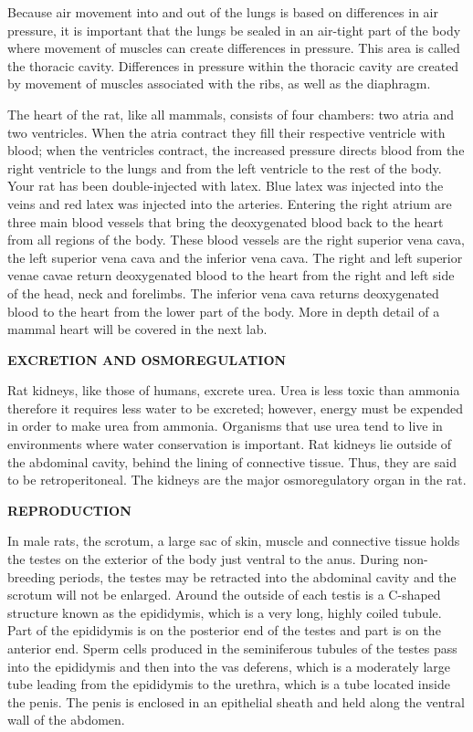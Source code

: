 \documentclass[
]{book}
\begin{document}
Because air movement into and out of the lungs is based on differences in air pressure, it is important that the lungs be sealed in an air-tight part of the body where movement of muscles
can create differences in pressure. This area is called the thoracic cavity. Differences in pressure
within the thoracic cavity are created by movement of muscles associated with the ribs, as well as the diaphragm.

The heart of the rat, like all mammals, consists of four chambers: two atria and two ventricles. When the atria contract they fill their respective ventricle with blood; when the ventricles contract, the increased pressure directs blood from the right ventricle to the lungs and from the left ventricle to the rest of the body. Your rat has been double-injected with latex. Blue latex was injected into the veins and red latex was injected into the arteries. Entering the right atrium are three main blood vessels that bring the deoxygenated blood back to the heart from all regions of the body. These blood vessels are the right superior vena cava, the left superior vena cava and the inferior vena cava. The right and left superior venae cavae return deoxygenated blood to the heart from the right and left side of the head, neck and forelimbs. The inferior vena cava returns deoxygenated blood to the heart from the lower part of the body. More in depth detail of a mammal heart will be covered in the next lab.

\textbf{EXCRETION AND OSMOREGULATION}

Rat kidneys, like those of humans, excrete urea. Urea is less toxic than ammonia therefore it requires less water to be excreted; however, energy must be expended in order to make urea from ammonia. Organisms that use urea tend to live in environments where water conservation
is important. Rat kidneys lie outside of the abdominal cavity, behind the lining of connective tissue. Thus, they are said to be retroperitoneal. The kidneys are the major osmoregulatory organ in the rat.

\textbf{REPRODUCTION}

In male rats, the scrotum, a large sac of skin, muscle and connective tissue holds the testes on
the exterior of the body just ventral to the anus. During non-breeding periods, the testes may be retracted into the abdominal cavity and the scrotum will not be enlarged. Around the outside of each testis is a C-shaped structure known as the epididymis, which is a very long, highly coiled
tubule. Part of the epididymis is on the posterior end of the testes and part is on the anterior end. Sperm cells produced in the seminiferous tubules of the testes pass into the epididymis and then into the vas deferens, which is a moderately large tube leading from the epididymis to the urethra, which is a tube located inside the penis. The penis is enclosed in an epithelial sheath and held along the ventral wall of the abdomen.
\end{document}

